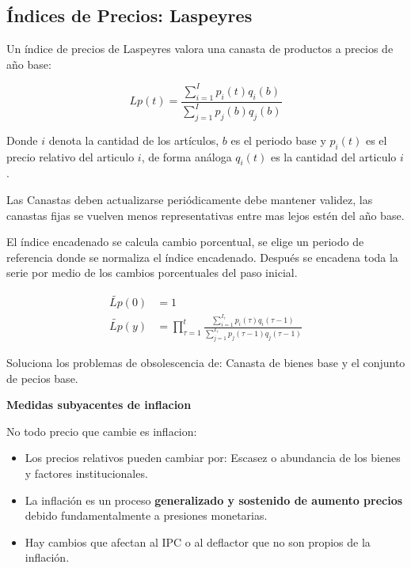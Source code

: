 \subsection{Índices de Precios: Laspeyres}

Un índice de precios de Laspeyres valora una canasta de productos a precios de año base:

\begin{equation}
    Lp(t) = \frac{\sum_{i=1}^{I}p_{i}(t)q_{i}(b)}{\sum_{j=1}^{I}p_{j}(b)q_{j}(b)}
\end{equation}


Donde $i$ denota la cantidad de los artículos, $b$ es el periodo base y $p_{i}(t)$ es el precio relativo del articulo $i$, de forma análoga $q_{i}(t)$ es la cantidad del articulo $i$.

Las Canastas deben actualizarse periódicamente debe mantener validez, las canastas fijas se vuelven menos representativas entre mas lejos estén del año base.

El índice encadenado se calcula cambio porcentual, se elige un periodo de referencia donde se normaliza el índice encadenado. Después se encadena toda la serie por medio de los cambios porcentuales del paso inicial. 

\begin{align}
    \tilde{Lp}(0)&= 1\\
    \tilde{Lp}(y) &= \prod^{t}_{\tau =1} \frac{\sum_{i=1}^{I_{\tau}}p_{i}(\tau)q_{i}(\tau-1)}{\sum_{j=1}^{I_{\tau}}p_{j}(\tau-1)q_{j}(\tau-1)}
\end{align}

Soluciona los problemas de obsolescencia de: Canasta de bienes base y el conjunto de pecios base. 

\textbf{Medidas subyacentes de inflacion}

No todo precio que cambie es inflacion:

\begin{itemize}
    \item Los precios relativos pueden cambiar por: Escasez o abundancia de los bienes y factores institucionales.
    \item La inflación es un proceso \textbf{generalizado y sostenido de aumento precios} debido fundamentalmente a presiones monetarias.
    \item Hay cambios que afectan al IPC o al deflactor que no son propios de la inflación.
\end{itemize}

